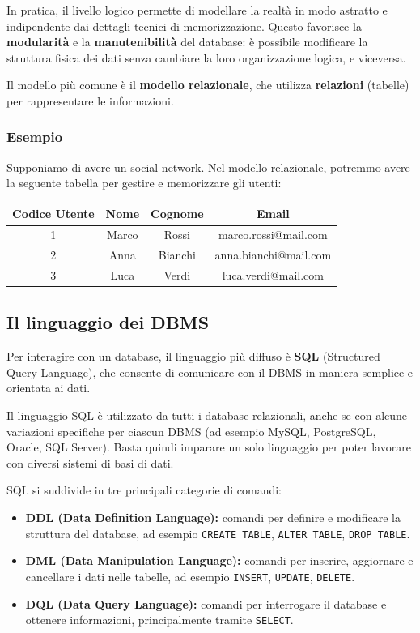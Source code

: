 \documentclass[a4paper,12pt]{article}
\begin{document}
In pratica, il livello logico permette di modellare la realtà in modo astratto e indipendente dai dettagli tecnici di memorizzazione. Questo favorisce la \textbf{modularità} e la \textbf{manutenibilità} del database: è possibile modificare la struttura fisica dei dati senza cambiare la loro organizzazione logica, e viceversa.

Il modello più comune è il  \textbf{modello relazionale}, che utilizza \textbf{relazioni} (tabelle) per rappresentare le informazioni.

\subsubsection*{Esempio}  
Supponiamo di avere un social network. Nel modello relazionale, potremmo avere la seguente tabella per gestire e memorizzare gli utenti:

\begin{center}
\begin{tabular}{|c|c|c|c|}
\hline
\textbf{Codice Utente} & \textbf{Nome} & \textbf{Cognome} & \textbf{Email} \\
\hline
1 & Marco & Rossi & marco.rossi@mail.com \\
2 & Anna & Bianchi & anna.bianchi@mail.com \\
3 & Luca & Verdi & luca.verdi@mail.com \\
\hline
\end{tabular}

\end{center}
 
\subsection{Il linguaggio dei DBMS}
Per interagire con un database, il linguaggio più diffuso è \textbf{SQL} (Structured Query Language), che consente di comunicare con il DBMS in maniera semplice e orientata ai dati.

Il linguaggio SQL è utilizzato da tutti i database relazionali, anche se con alcune variazioni specifiche per ciascun DBMS (ad esempio MySQL, PostgreSQL, Oracle, SQL Server). Basta quindi imparare un solo linguaggio per poter lavorare con diversi sistemi di basi di dati.


SQL si suddivide in tre principali categorie di comandi:

\begin{itemize}
    \item \textbf{DDL (Data Definition Language):} comandi per definire e modificare la struttura del database, ad esempio \texttt{CREATE TABLE}, \texttt{ALTER TABLE}, \texttt{DROP TABLE}.
    \item \textbf{DML (Data Manipulation Language):} comandi per inserire, aggiornare e cancellare i dati nelle tabelle, ad esempio \texttt{INSERT}, \texttt{UPDATE}, \texttt{DELETE}.
    \item \textbf{DQL (Data Query Language):} comandi per interrogare il database e ottenere informazioni, principalmente tramite \texttt{SELECT}.
\end{itemize}
\end{document}
